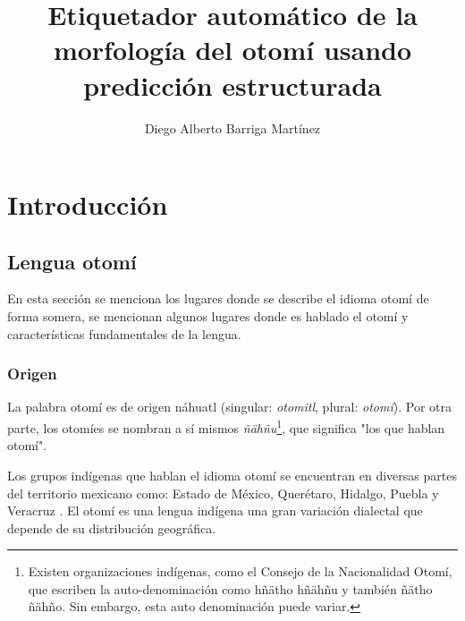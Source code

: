 \documentclass[letterpaper,12pt,oneside]{book}
\theoremstyle{definition}
\begin{document}

	
	\author{Diego Alberto Barriga Martínez}

	\title{Etiquetador automático de la morfología del otomí usando predicción estructurada}

	\tableofcontents

	\maketitle

	


	
	\chapter{Introducción}

	

	
	\section{Lengua otomí}

	
	En esta sección se menciona los lugares donde se describe el idioma otomí de forma somera, se mencionan algunos lugares donde es hablado el otomí y características fundamentales de la lengua.

	
	\subsection{Origen}

	

	La palabra otomí es de origen náhuatl (singular: \textit{otomitl}, plural: \textit{otomí}). Por otra parte, los otomíes se nombran a sí mismos \textit{ñähñu}\footnote{Existen organizaciones indígenas, como el Consejo de la Nacionalidad Otomí, que escriben la auto-denominación como hñätho hñähñu y también ñätho ñähño. Sin embargo, esta auto denominación puede variar.}, que significa "los que hablan otomí".

	
	Los grupos indígenas que hablan el idioma otomí se encuentran en diversas partes del territorio mexicano como: Estado de México, Querétaro, Hidalgo, Puebla y Veracruz \citep{barrientos2004otomies}. El otomí es una lengua indígena una gran variación dialectal que depende de su distribución geográfica.
\end{document}
